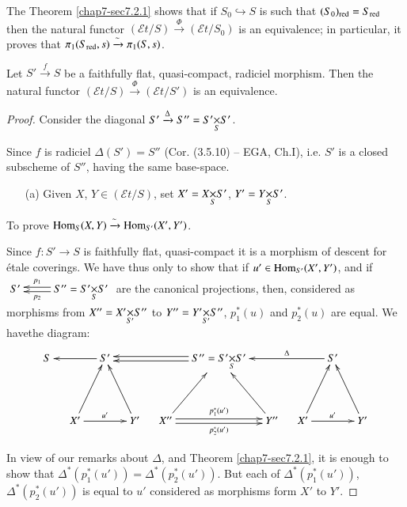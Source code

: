 \begin{remark*}
The Theorem \ref{chap7-sec7.2.1} shows that if $S_{0}\hookrightarrow S$ is
such that $(S_{0})_{\red}\break =S_{\red}$ then the natural functor
$(\mathscr{E}t/S)\xrightarrow{\Phi}(\mathscr{E}t/S_{0})$ is an
equivalence; in particular, it proves that
$\pi_{1}(S_{\operatorname{red}},s)\xrightarrow{\sim}\pi_{1}(S,s)$. 
\end{remark*}

\setcounter{prop}{1}
\begin{prop}\label{chap7-prop7.2.2}
Let $S'\xrightarrow{f}S$ be a faithfully flat, quasi-compact, radiciel
morphism. Then the natural functor
$(\mathscr{E}t/S)\xrightarrow{\Phi}(\mathscr{E}t/S')$ is an equivalence.
\end{prop}

\begin{proof}
Consider the diagonal $S'\xrightarrow{\Delta}S''=\fprod{S'}{S'}{S}$.

Since $f$ is radiciel $\Delta(S')=S''$ (Cor. (3.5.10) -- EGA, Ch.I),
i.e. $S'$ is a closed subscheme of $S''$, having the same base-space.
\begin{itemize}
\item[(a)] Given $X$, $Y\in (\mathscr{E}t/S)$, set
  $X'=\fprod{X}{S'}{S}$, $Y'=\fprod{Y}{S'}{S}$.
\end{itemize}

To prove $\operatorname{Hom}_{S}(X,Y)\xrightarrow{\sim}\operatorname{Hom}_{S'}(X',Y')$.

Since $f:S'\to S$ is faithfully flat, quasi-compact it is a morphism
of descent for \'etale coverings. We have thus only to show that if
$u'\in \operatorname{Hom}_{S'}(X',Y')$, and if $\xymatrix{S' &
  \ar@<-.2em>[l]_-{p_{1}}\ar@<.2em>[l]^-{p_{2}}
  S''=\fprod{S'}{S'}{S}}$ are the canonical projections, then,
considered as morphisms from $X''=\fprod{X'}{S''}{S'}$ to
$Y''=\fprod{Y'}{S''}{S'}$, $p^{\ast}_{1}(u)$ and $p^{\ast}_{2}(u)$ are
equal. We have\pageoriginale the diagram:
\[
\xymatrix@C=.4cm@R=1.4cm{
S && \ar[ll] S' && & \ar@<-.2em>[lll]\ar@<.2em>[lll]
S''=\fprod{S'}{S'}{S} &&& S'\ar[lll]_-{\Delta} &\\
& X'\ar[ur]\ar[rr]^{u'} && Y'\ar[ul] & 
X''\ar@<.2em>[rr]^{p^{\ast}_{1}(u')}\ar@<-.2em>[rr]_{p^{\ast}_{2}(u')}\ar[ur] &&
Y''\ar[ul] & X'\ar[rr]^{u'}\ar[ur] && Y'\ar[ul]
}
\]

In view of our remarks about $\Delta$, and Theorem \ref{chap7-sec7.2.1}, it
is enough to show that
$\Delta^{\ast}(p^{\ast}_{1}(u'))=\Delta^{\ast}(p^{\ast}_{2}(u'))$. But
each of $\Delta^{\ast}(p^{\ast}_{1}(u'))$,
$\Delta^{\ast}(p^{\ast}_{2}(u'))$ is equal to $u'$ considered as
morphisms form $X'$ to $Y'$.


\end{proof}
